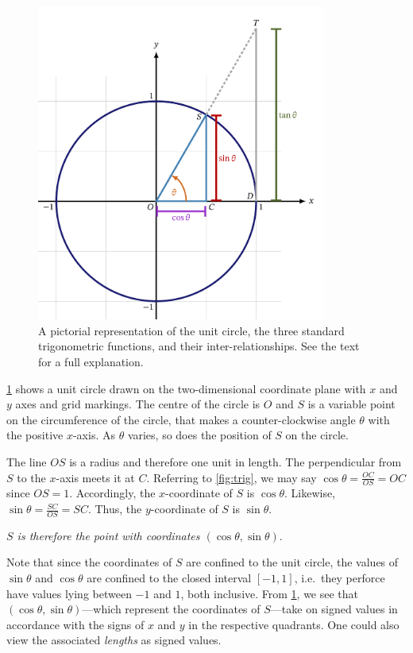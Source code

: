 \documentclass[
  a4paper,
]{article}
\begin{document}
\begin{figure}
\hypertarget{fig:unit}{%
\centering
\includegraphics[width=0.85\textwidth,height=\textheight]{images/unit-circle.png}
\caption{A pictorial representation of the unit circle, the three
standard trigonometric functions, and their inter-relationships. See the
text for a full explanation.}\label{fig:unit}
}
\end{figure}

\cref{fig:unit} shows a unit circle drawn on the two-dimensional
coordinate plane with \(x\) and \(y\) axes and grid markings. The centre
of the circle is \(O\) and \(S\) is a variable point on the
circumference of the circle, that makes a counter-clockwise angle
\(\theta\) with the positive \(x\)-axis. As \(\theta\) varies, so does
the position of \(S\) on the circle.

The line \(OS\) is a radius and therefore one unit in length. The
perpendicular from \(S\) to the \(x\)-axis meets it at \(C\). Referring
to \cref{fig:trig}, we may say \(\cos\theta = \frac{OC}{OS} = OC\) since
\(OS = 1\). Accordingly, the \(x\)-coordinate of \(S\) is
\(\cos\theta\). Likewise, \(\sin\theta = \frac{SC}{OS} = SC\). Thus, the
\(y\)-coordinate of \(S\) is \(\sin\theta\).

\emph{\(S\) is therefore the point with coordinates
\((\cos\theta, \sin\theta)\)}.

Note that since the coordinates of \(S\) are confined to the unit
circle, the values of \(\sin\theta\) and \(\cos\theta\) are confined to
the closed interval \([-1, 1]\), i.e.~they perforce have values lying
between \(-1\) and \(1\), both inclusive. From \cref{fig:unit}, we see
that \((\cos\theta, \sin\theta)\)---which represent the coordinates of
\(S\)---take on signed values in accordance with the signs of \(x\) and
\(y\) in the respective quadrants. One could also view the associated
\emph{lengths} as signed values.
\end{document}
